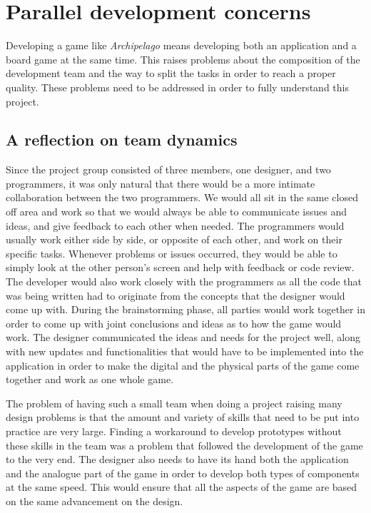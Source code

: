 \section{Parallel development concerns}

Developing a game like \textit{Archipelago} means developing both an application and a board game at the same time. This raises problems about the composition of the development team and the way to split the tasks in order to reach a proper quality. These problems need to be addressed in order to fully understand this project.

\subsection{A reflection on team dynamics}
Since the project group consisted of three members, one designer, and two programmers, it was only natural that there would be a more intimate collaboration between the two programmers. We would all sit in the same closed off area and work so that we would always be able to communicate issues and ideas, and give feedback to each other when needed. The programmers would usually work either side by side, or opposite of each other, and work on their specific tasks. Whenever problems or issues occurred, they would be able to simply look at the other person's screen and help with feedback or code review. The developer would also work closely with the programmers as all the code that was being written had to originate from the concepts that the designer would come up with. During the brainstorming phase, all parties would work together in order to come up with joint conclusions and ideas as to how the game would work. The designer communicated the ideas and needs for the project well, along with new updates and functionalities that would have to be implemented into the application in order to make the digital and the physical parts of the game come together and work as one whole game. 

The problem of having such a small team when doing a project raising many design problems is that the amount and variety of skills that need to be put into practice are very large. Finding a workaround to develop prototypes without these skills in the team was a problem that followed the development of the game to the very end. The designer also needs to have its hand both the application and the analogue part of the game in order to develop both types of components at the same speed. This would ensure that all the aspects of the game are based on the same advancement on the design.

